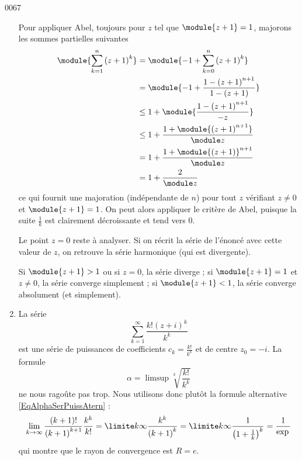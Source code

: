 \begin{corrige}{0067}
\begin{enumerate}
Pour appliquer Abel, toujours pour $z$ tel que $\module{z+1} = 1$,
majorons les sommes partielles suivantes
\begin{equation*}
\begin{split}
\module{\sum_{k=1}^n {(z+1)}^k} &= \module{-1 + \sum_{k=0}^n
{(z+1)}^k}\\
&= \module{-1 + \frac{1 - {(z+1)}^{n+1}}{1 - (z + 1)}}\\
&\leq 1 + \module{\frac{1 - {(z+1)}^{n+1}}{-z}}\\
&\leq 1 + \frac{1 + \module{{(z+1)}^{n+1}}}{\module z}\\
&= 1 + \frac{1 + {\module{(z+1)}}^{n+1}}{\module z}\\
&= 1 + \frac{2}{\module z}
\end{split}
\end{equation*}
ce qui fournit une majoration (indépendante de $n$) pour tout $z$ vérifiant $z \neq 0$ et $\module{z+1}= 1$. On peut alors appliquer le critère de Abel, puisque la suite $\frac{1}{k}$ est clairement décroissante et tend vers $0$.

Le point $z = 0$ reste à analyser. Si on récrit la série de l'énoncé avec cette valeur de $z$, on retrouve la série harmonique (qui est divergente).

\conclusion
Si $\module{z+1} > 1$ ou si $z = 0$, la série diverge ; si $\module{z+1} = 1$ et $z \neq 0$, la série converge simplement ; si $\module{z+1} < 1$, la série converge absolument (et simplement).

\item 
La série
\begin{equation}\label{eq:seriepuissances-exo-c}
	\sum_{k=1}^\infty \frac{k! {(z+i)}^k}{k^k}
\end{equation}
est une série de puissances de coefficients $c_k = \frac{ k! }{ k^k }$ et de centre $z_0 = -i$. La formule
\begin{equation}
	\alpha=\limsup\sqrt[k]{\frac{ k! }{ k^k }}
\end{equation}
ne nous ragoûte pas trop. Nous utilisons donc plutôt la formule alternative \eqref{EqAlphaSerPuissAtern} :
\begin{equation}
	\lim_{k\to \infty} \frac{(k+1)!}{{(k+1)}^{k+1}}\frac{k^k}{k!} = \limite k
	\infty \frac{k^k}{{(k+1)}^k} = \limite k \infty
	\frac{1}{{\left(1+\frac{1}{k}\right)}^k} = \frac 1 {\exp{ }}
\end{equation}
qui montre que le rayon de convergence est $R = e$.


\end{enumerate}
\end{corrige}
